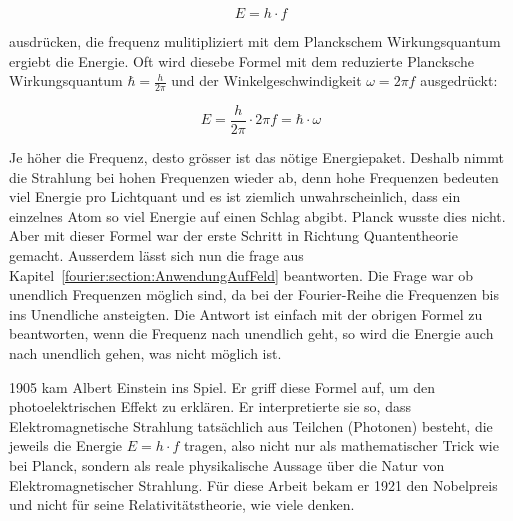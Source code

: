 	\begin{equation}
		E = h \cdot f
	\end{equation}
	
	 ausdrücken, die frequenz mulitipliziert mit dem Planckschem Wirkungsquantum ergiebt die Energie.
	 Oft wird diesebe Formel mit dem reduzierte Plancksche Wirkungsquantum $\hbar = \frac{h}{2\pi}$ und der Winkelgeschwindigkeit $\omega = 2 \pi f$ ausgedrückt:
	 
	 \begin{equation}
	  	E = \frac{h}{2\pi} \cdot 2\pi f = \hbar \cdot \omega
	 \end{equation}
	 
	 
	Je höher die Frequenz, desto grösser ist das nötige Energiepaket. 
	Deshalb nimmt die Strahlung bei hohen Frequenzen wieder ab, denn hohe Frequenzen bedeuten viel Energie pro Lichtquant und es ist ziemlich unwahrscheinlich, dass ein einzelnes Atom so viel Energie auf einen Schlag abgibt. 
	Planck wusste dies nicht. 
	Aber mit dieser Formel war der erste Schritt in Richtung  Quantentheorie gemacht.
	Ausserdem lässt sich nun die frage aus Kapitel~\ref{fourier:section:AnwendungAufFeld} beantworten. 
	Die Frage war ob unendlich Frequenzen möglich sind, da bei der Fourier-Reihe die Frequenzen bis ins Unendliche ansteigten. 
	Die Antwort ist einfach mit der obrigen Formel zu beantworten, wenn die Frequenz nach unendlich geht, so wird die Energie auch nach unendlich gehen, was nicht möglich ist.

	
	
	
	1905 kam Albert Einstein ins Spiel. 
	Er griff diese Formel auf, um den photoelektrischen Effekt zu erklären. 
	Er interpretierte sie so, dass Elektromagnetische Strahlung tatsächlich aus Teilchen (Photonen) besteht, die jeweils die Energie $E = h \cdot f$ tragen, also nicht nur als mathematischer Trick wie bei Planck, sondern als reale physikalische Aussage über die Natur von Elektromagnetischer Strahlung.
	Für diese Arbeit bekam er 1921 den Nobelpreis und nicht für seine Relativitätstheorie, wie viele denken.
	
	 
	
	

